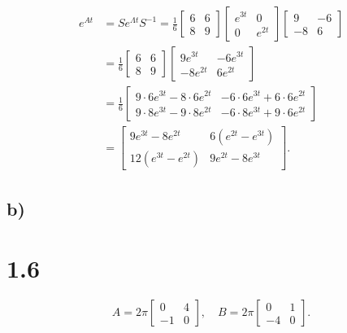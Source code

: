\documentclass[a4paper]{article}
\newcommand{\mat}[1]{\bm{\mathit{#1}}}
\begin{document}
\begin{align*}
  e^{\mat{A}t} &= \mat{S}e^{\Lambda t}\mat{S}^{-1} = \frac 16 \begin{bmatrix}6 & 6\\8 & 9\end{bmatrix}\begin{bmatrix}e^{3t} & 0\\0 & e^{2t}\end{bmatrix}\begin{bmatrix}9 & -6\\-8 & 6\end{bmatrix}\\[2ex]
               &= \frac 16 \begin{bmatrix}6 & 6\\8 & 9\end{bmatrix}\begin{bmatrix}9e^{3t} & -6e^{3t}\\-8e^{2t} & 6e^{2t}\end{bmatrix}\\[2ex]
               &= \frac 16 \begin{bmatrix}9\cdot 6e^{3t} - 8\cdot 6e^{2t} & -6\cdot 6e^{3t} + 6\cdot 6e^{2t}\\9\cdot 8e^{3t} - 9\cdot 8e^{2t} & -6\cdot 8e^{3t} + 9\cdot 6e^{2t}\end{bmatrix}\\[2ex]
               &= \begin{bmatrix}9e^{3t} - 8e^{2t} & 6\left( e^{2t} - e^{3t} \right)\\12\left( e^{3t} - e^{2t} \right) & 9e^{2t} - 8e^{3t}\end{bmatrix}.
\end{align*}

\subsection*{b)}

\section*{1.6}

\begin{equation*}
  \mat{A} = 2\pi\begin{bmatrix}0 & 4\\-1 & 0\end{bmatrix},\quad \mat{B} = 2\pi\begin{bmatrix}0 & 1\\-4 & 0\end{bmatrix}.
\end{equation*}
\end{document}

